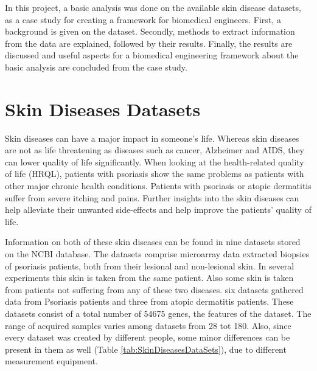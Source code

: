 \documentclass[10pt,a4paper]{article}
\begin{document}
	In this project, a basic analysis was done on the available skin disease datasets, as a case study for creating a framework for biomedical engineers. First, a background is given on the dataset. Secondly, methods to extract information from the data are explained, followed by their results. Finally, the results are discussed and useful aspects for a biomedical engineering framework about the basic analysis are concluded from the case study.
	
	
	\section{Skin Diseases Datasets}
	\label{sec:SkinDiseasesDataSet}
	
	Skin diseases can have a major impact in someone's life. Whereas skin diseases are not as life threatening as diseases such as cancer, Alzheimer and AIDS, they can lower quality of life significantly. When looking at the health-related quality of life (HRQL), patients with psoriasis show the same problems as patients with other major chronic health conditions\cite{rapp1999psoriasis}. Patients with psoriasis or atopic dermatitis suffer from severe itching and pains. Further insights into the skin diseases can help alleviate their unwanted side-effects and help improve the patients' quality of life\cite{jowett1985skin}.
	
	Information on both of these skin diseases can be found in nine datasets stored on the NCBI database\cite{edgar2002gene}. The datasets comprise microarray data extracted biopsies of psoriasis patients, both from their lesional and non-lesional skin. In several experiments this skin is taken from the same patient. Also some skin is taken from patients not suffering from any of these two diseases. six datasets gathered data from Psoriasis patients and three from atopic dermatitis patients. These datasets consist of a total number of 54675 genes, the features of the dataset. The range of acquired samples varies among datasets from 28 tot 180. Also, since every dataset was created by different people, some minor differences can be present in them as well (Table \ref{tab:SkinDiseasesDataSets}), due to different measurement equipment.
	
\end{document}
